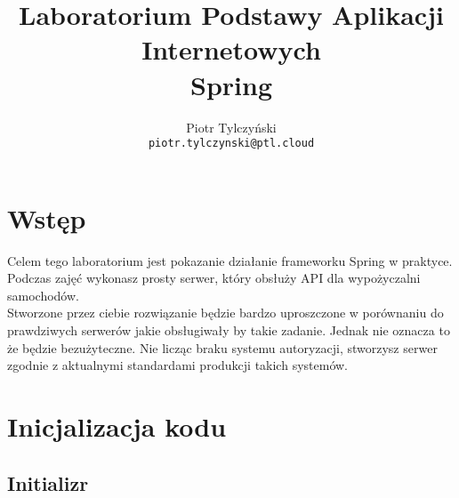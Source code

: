 \documentclass{article}
\begin{document}
    \title{Laboratorium Podstawy Aplikacji Internetowych \\
    Spring}
    \author{Piotr Tylczyński \\
    \texttt{piotr.tylczynski@ptl.cloud}}
    
    \begin{titlepage}
        \maketitle
    \end{titlepage}
    
    \tableofcontents
    \pagebreak
    
    \section{Wstęp}
    Celem tego laboratorium jest pokazanie działanie frameworku Spring w praktyce. Podczas zajęć wykonasz prosty serwer, który obsłuży API dla wypożyczalni samochodów. \\
    Stworzone przez ciebie rozwiązanie będzie bardzo uproszczone w porównaniu do prawdziwych serwerów jakie obsługiwały by takie zadanie. Jednak nie oznacza to że będzie bezużyteczne. Nie licząc braku systemu autoryzacji, stworzysz serwer zgodnie z aktualnymi standardami produkcji takich systemów.
    
    \section{Inicjalizacja kodu}
        \subsection{Initializr}
            
\end{document}
